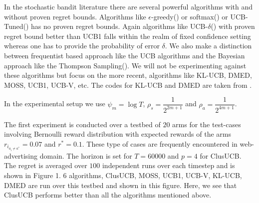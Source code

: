 %
%
%
%
%
%
%
%


In the stochastic bandit literature there are several powerful algorithms with and without proven regret bounds. Algorithms like $\epsilon$-greedy(\cite{sutton1998reinforcement}) or softmax(\cite{sutton1998reinforcement}) or UCB-Tuned(\cite{auer2002finite}) has no proven regret bounds. Again algorithms like UCB-$\delta$(\cite{abbasi2011improved}) with proven regret bound better than UCB1  falls within the realm of fixed confidence setting whereas one has to provide the probability of error $\delta$. We also make a distinction between frequentist based approach like the UCB algorithms and the Bayesian approach like the Thompson Sampling(\cite{agrawal2011analysis}). We will not be experimenting against these algorithms but focus on the more recent, algorithms like KL-UCB, DMED, MOSS, UCB1, UCB-V, etc. The codes for KL-UCB and DMED are taken from \cite{CapGarKau12}.

In the experimental setup we use $\psi_{m}=\log T$, $\rho_{s}=\dfrac{1}{2^{2m+1}}$ and $\rho_{a}=\dfrac{1}{2^{4m+1}}$.

The first experiment is conducted over a testbed of $20$ arms for the test-cases involving Bernoulli reward distribution with expected rewards of the arms $r_{i_{a_{i}\neq a^{*}}}=0.07$ and $r^{*}=0.1$. These type of cases are frequently encountered in web-advertising domain. The horizon is set for $T=60000$ and $p=4$ for ClusUCB. The regret is averaged over $100$ independent runs over each timestep and is shown in Figure 1. $6$ algorithms, ClusUCB, MOSS, UCB1, UCB-V, KL-UCB, DMED are run over this testbed and shown in this figure. Here, we see that ClusUCB performs better than all the algorithms mentioned above.

